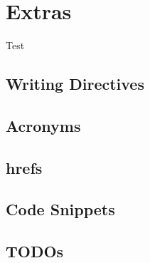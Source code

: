 \chapter{Extras}
\label{chap:extras}

\begin{writingdirectives}

    \item Test

\end{writingdirectives}

\section{Writing Directives}
\label{chap:extras:sec:writing-directives}

\section{Acronyms}
\label{chap:extras:sec:acronyms}

\section{\acsp{href}}
\label{chap:extras:sec:hrefs}

\section{Code Snippets}
\label{chap:extras:sec:code-snippets}

\section{TODOs}
\label{chap:extras:sec:todos}
